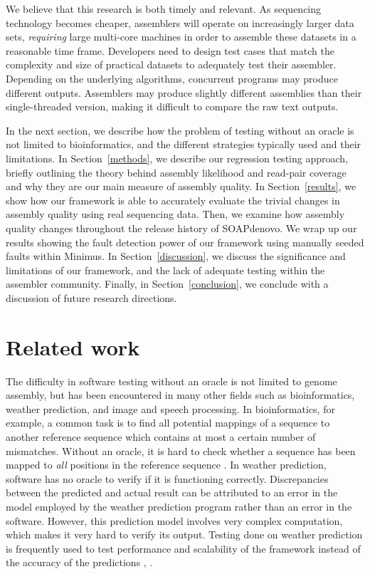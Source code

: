 \documentclass[12pt,\mydriver]{thesis}
\begin{document}
We believe that this research is both timely and relevant.  As sequencing
technology becomes cheaper, assemblers will operate on increasingly larger data
sets, \emph{requiring} large multi-core machines in order to assemble these
datasets in a reasonable time frame.  Developers need to design test cases
that match the complexity and size of practical datasets to adequately test
their assembler.  Depending on the underlying algorithms, concurrent programs
may produce different outputs.  Assemblers may produce slightly different
assemblies than their single-threaded version, making it difficult to compare
the raw text outputs.

In the next section,
we describe how the problem of testing without an oracle is not limited to bioinformatics, and the different strategies typically used and their limitations.
In Section~\ref{methods}, we describe our regression testing approach, briefly outlining the theory behind assembly likelihood and read-pair coverage and why they are our main measure of assembly quality.
In Section~\ref{results}, we show how our framework is able to accurately evaluate the trivial changes in assembly quality using real sequencing data.  Then, we examine how assembly quality changes throughout the release history of SOAPdenovo.  We wrap up our results showing the fault detection power of our framework using manually seeded faults within Minimus.
In Section~\ref{discussion}, we discuss the significance and limitations of our framework, and the lack of adequate testing within the assembler community.
Finally, in Section~\ref{conclusion}, we conclude with a discussion of future research directions.

\section{Related work}
\label{related_works}
The difficulty in software testing without an oracle is not limited to genome assembly,
 but has been encountered in many other fields such as bioinformatics, weather prediction, and image and speech processing. In bioinformatics, for example, a common task is to
find all potential mappings of a sequence to another reference sequence which contains at most a certain number of mismatches.
Without an oracle, it is hard to check whether a sequence has been mapped to \emph{all} positions in the reference sequence \cite{chen2009innovative}. In weather prediction, software has no oracle to verify if it is functioning correctly. Discrepancies between the predicted and actual result can be attributed to an error in the model employed by the weather prediction program rather than an error in the software. However, this prediction model involves very complex computation, which makes it very hard to verify its output. Testing done on weather prediction is frequently used to test performance and scalability of the framework instead of the accuracy of the predictions \cite{delgado2010performance}, \cite{michalakes2004weather}.
\end{document}
